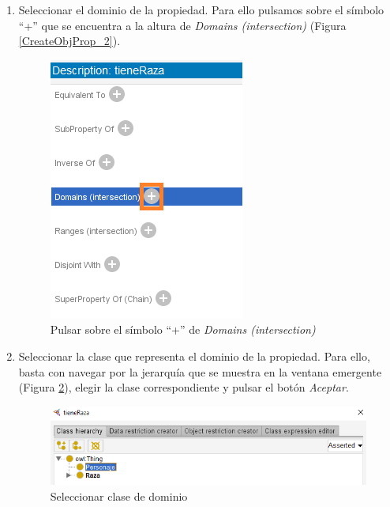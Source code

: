 \begin{enumerate}
    \item Seleccionar el dominio de la propiedad. Para ello pulsamos sobre el símbolo “+” que se encuentra a la altura de 
    \textit{Domains (intersection)} (Figura \ref*{CreateObjProp_2}).
    \begin{figure}[ht]
        \centering
        \includegraphics[scale=0.6]{Figures/Protege/CreateObjProp_3.png}
        \caption{Pulsar sobre el símbolo “+” de \textit{Domains (intersection)}}
        \label{CreateObjProp_3}
    \end{figure}

    \item Seleccionar la clase que representa el dominio de la propiedad. Para ello, basta con navegar por la 
    jerarquía que se muestra en la ventana emergente (Figura \ref*{CreateObjProp_4}), elegir la clase correspondiente 
    y pulsar el botón \textit{Aceptar}.

    \begin{figure}[H]
        \centering
        \includegraphics[scale=0.6]{Figures/Protege/CreateObjProp_4.png}
        \caption{Seleccionar clase de dominio}
        \label{CreateObjProp_4}
    \end{figure}


\end{enumerate}
